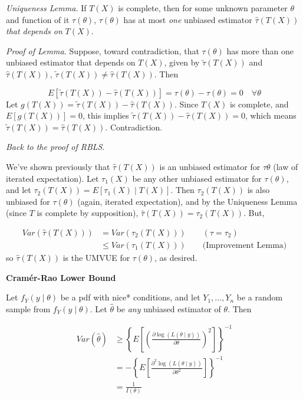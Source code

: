 \documentclass[
  letterpaper,
  DIV=11,
  numbers=noendperiod]{scrreprt}
\begin{document}
\emph{Uniqueness Lemma.} If \(T(X)\) is complete, then for some unknown
parameter \(\theta\) and function of it \(\tau(\theta)\),
\(\tau(\theta)\) has at most \emph{one} unbiased estimator
\(\hat{\tau}(T(X))\) \emph{that depends on} \(T(X)\).

\emph{Proof of Lemma.} Suppose, toward contradiction, that
\(\tau(\theta)\) has more than one unbiased estimator that depends on
\(T(X)\), given by \(\tilde{\tau}(T(X))\) and \(\hat{\tau}(T(X))\),
\(\tilde{\tau}(T(X)) \neq \hat{\tau}(T(X))\). Then

\[
E[\tilde{\tau}(T(X)) - \hat{\tau}(T(X))] = \tau(\theta) - \tau(\theta) = 0 \quad \forall \theta
\] Let \(g(T(X)) = \tilde{\tau}(T(X)) - \hat{\tau}(T(X))\). Since
\(T(X)\) is complete, and \(E[g(T(X))] = 0\), this implies
\(\tilde{\tau}(T(X)) - \hat{\tau}(T(X)) = 0\), which means
\(\tilde{\tau}(T(X)) = \hat{\tau}(T(X))\). Contradiction.

\emph{Back to the proof of RBLS}.

We've shown previously that \(\hat{\tau}(T(X))\) is an unbiased
estimator for \(\tau{\theta}\) (law of iterated expectation). Let
\(\tau_1(X)\) be any other unbiased estimator for \(\tau(\theta)\), and
let \(\tau_2(T(X)) = E[\tau_1(X) \mid T(X)]\). Then \(\tau_2(T(X))\) is
also unbiased for \(\tau(\theta)\) (again, iterated expectation), and by
the Uniqueness Lemma (since \(T\) is complete by supposition),
\(\hat{\tau}(T(X)) = \tau_2(T(X))\). But,

\begin{align*}
    Var(\hat{\tau}(T(X))) & = Var(\tau_2(T(X))) \quad \quad (\hat{\tau} = \tau_2) \\
    & \leq Var(\tau_1(T(X))) \quad \quad \text{(Improvement Lemma)}
\end{align*} so \(\hat{\tau}(T(X))\) is the UMVUE for \(\tau(\theta)\),
as desired.

\textbf{Cramér-Rao Lower Bound}

Let \(f_Y(y \mid \theta)\) be a pdf with nice* conditions, and let
\(Y_1, \dots, Y_n\) be a random sample from \(f_Y(y \mid \theta)\). Let
\(\hat{\theta}\) be \emph{any} unbiased estimator of \(\theta\). Then

\begin{align*} 
Var(\hat{\theta}) & \geq \left\{ E\left[ \left( \frac{\partial \log( L(\theta \mid y))}{\partial \theta}\right)^2\right]\right\}^{-1} \\
& = -\left\{ E\left[ \frac{\partial^2 \log( L(\theta \mid y))}{\partial \theta^2} \right] \right\}^{-1} \\
& = \frac{1}{I(\theta)}
\end{align*}
\end{document}
